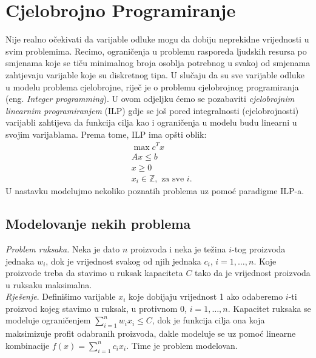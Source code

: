 \documentclass[a4paper, utf8, 11pt, colorlinks]{book}
\begin{document}
\newpage
\chapter{Cjelobrojno Programiranje}

Nije realno očekivati da varijable odluke mogu da dobiju neprekidne vrijednosti u svim problemima. Recimo, ograničenja u problemu rasporeda ljudskih resursa po smjenama koje se tiču minimalnog broja osoblja potrebnog u svakoj od smjenama zahtjevaju varijable koje su diskretnog tipa. U slučaju da su sve varijable odluke u modelu problema cjelobrojne, riječ je o problemu cjelobrojnog programiranja (eng. \emph{Integer programming}). 
U ovom odjeljku ćemo se pozabaviti   \emph{cjelobrojnim linearnim programiranjem} (ILP) gdje se još pored integralnosti (cjelobrojnosti) varijabli zahtijeva da funkcija cilja kao i ograničenja u modelu budu linearni u svojim varijablama. Prema tome, ILP ima opšti oblik:
\begin{align}
    & \max c^T x \nonumber\\
    & A x \leq b \nonumber \\
    & x \geq 0 \nonumber\\
    & x_i \in \mathbb{Z}, \mbox{ za sve } i. \label{ilp-formulation}
\end{align}
U nastavku modelujmo nekoliko poznatih problema uz pomoć paradigme ILP-a. 

\section{Modelovanje nekih problema}

\emph{Problem ruksaka.} Neka je dato $n$ proizvoda i neka je težina $i$-tog proizvoda jednaka $w_i$, dok je vrijednost svakog od njih jednaka $c_i$, $i=1,\ldots,n$. Koje proizvode treba da stavimo u ruksak kapaciteta $C$ tako da je vrijednost proizvoda u ruksaku maksimalna. \\
\emph{Rješenje}. Definišimo varijable $x_i$ koje dobijaju vrijednost 1 ako odaberemo $i$-ti proizvod kojeg stavimo u ruksak, u protivnom 0, $i=1,\ldots,n$. Kapacitet ruksaka se modeluje ograničenjem $\sum_{i=1}^n w_i x_i \leq C$, dok je funkcija cilja ona koja maksimizuje profit odabranih proizvoda, dakle modeluje se uz pomoć linearne kombinacije $f(x) = \sum_{i=1}^n c_i x_i$. Time je problem modelovan.
\end{document}
